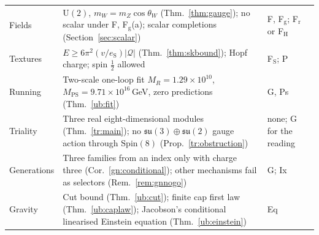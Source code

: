 \documentclass[aps,pra,onecolumn,superscriptaddress,nofootinbib,10pt]{revtex4-2}
\theoremstyle{definition}
\theoremstyle{remark}
\newcommand{\U}{\mathrm{U}}
\begin{document}
\begin{table}[h]
\begin{tabular}{@{}p{}p{}p{}@{}}
Fields & $\U(2)$, $m_W=m_Z\cos\theta_W$ (Thm.~\ref{thm:gauge}); no scalar under F, F$_{\mathrm g}$(a); scalar completions (Section~\ref{sec:scalar}) & F, F$_{\mathrm g}$; F$_{\mathrm r}$ or F$_{\mathrm H}$\\
Textures & $E\ge6\pi^2(v/e_{\mathrm S})\lvert\mathcal Q\rvert$ (Thm.~\ref{thm:skbound}); Hopf charge; spin $\tfrac12$ allowed & F$_{\mathrm S}$; P\\
Running & Two-scale one-loop fit $M_R=1.29\times10^{10}$, $M_{\mathrm{PS}}=9.71\times10^{16}$\,GeV, zero predictions (Thm.~\ref{ub:fit}) & G, Ps\\
Triality & Three real eight-dimensional modules (Thm.~\ref{tr:main}); no $\mathfrak{su}(3)\oplus\mathfrak{su}(2)$ gauge action through $\mathrm{Spin}(8)$ (Prop.~\ref{tr:obstruction}) & none; G for the reading\\
Generations & Three families from an index only with charge three (Cor.~\ref{gn:conditional}); other mechanisms fail as selectors (Rem.~\ref{rem:gnnogo}) & G; Ix\\
Gravity & Cut bound (Thm.~\ref{ub:cut}); finite cap first law (Thm.~\ref{ub:caplaw}); Jacobson's conditional linearised Einstein equation (Thm.~\ref{ub:einstein}) & Eq\\
\bottomrule
\end{tabular}
\end{table}
\end{document}
